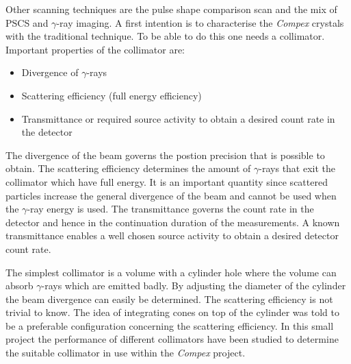 \documentclass[a4paper]{article}
\begin{document}
Other scanning techniques are the pulse shape comparison scan and the mix of PSCS and $\gamma$-ray imaging.
A first intention is to characterise the \textit{Compex} crystals with the traditional technique.
To be able to do this one needs a collimator.
Important properties of the collimator are:
\begin{itemize}
  \item Divergence of $\gamma$-rays
  \item Scattering efficiency (full energy efficiency)
  \item Transmittance or required source activity to obtain a desired count rate in the detector
\end{itemize}
The divergence of the beam governs the postion precision that is possible to obtain. The scattering efficiency determines the amount of $\gamma$-rays that exit the collimator which have full energy. It is an important quantity since scattered particles increase the general divergence of the beam and cannot be used when the $\gamma$-ray energy is used. The transmittance governs the count rate in the detector and hence in the continuation duration of the measurements. A known transmittance enables a well chosen source activity to obtain a desired detector count rate.

The simplest collimator is a volume with a cylinder hole where the volume can absorb $\gamma$-rays which are emitted badly.
By adjusting the diameter of the cylinder the beam divergence can easily be determined.
The scattering efficiency is not trivial to know.
The idea of integrating cones on top of the cylinder was told to be a preferable configuration concerning the scattering efficiency.
In this small project the performance of different collimators have been studied to determine the suitable collimator in use within the \textit{Compex} project.
\end{document}
